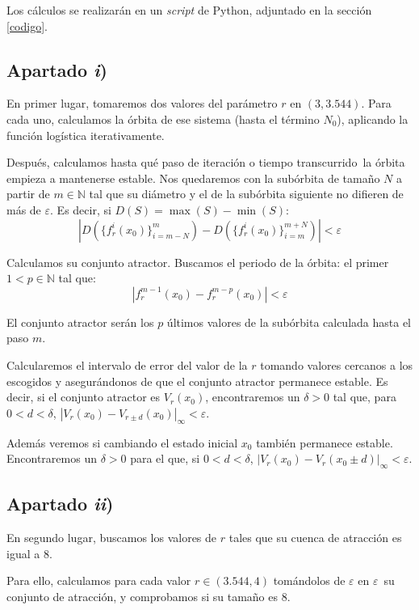 \documentclass[a4paper]{article}
\begin{document}
	Los cálculos se realizarán en un \textit{script} de Python, adjuntado en la sección \ref{codigo}.
	
	\subsection{Apartado \textit{i})}
	
	En primer lugar, tomaremos dos valores del parámetro $r$ en $(3,3.544)$. Para cada uno, calculamos la órbita de ese sistema (hasta el término $N_0$), aplicando la función logística iterativamente. 
	
	Después, calculamos hasta qué paso de iteración \textemdash o tiempo transcurrido\textemdash~la órbita empieza a mantenerse estable. Nos quedaremos con la subórbita de tamaño $N$ a partir de $m\in\mathbb{N}$ tal que su diámetro y el de la subórbita siguiente no difieren de más de $\varepsilon$. Es decir, si $D(S)=\max(S)-\min(S)$:
	\[ \left|D\left(\{f_r^i(x_0)\}_{i=m-N}^{m}\right) - D\left(\{f_r^i(x_0)\}_{i=m}^{m+N}\right)\right| < \varepsilon \]
	
	Calculamos su conjunto atractor. Buscamos el periodo de la órbita: el primer $1<p\in\mathbb{N}$ tal que:	
	\[ \left|f_r^{m-1}(x_0) - f_r^{m-p}(x_0)\right| < \varepsilon \]
	
	El conjunto atractor serán los $p$ últimos valores de la subórbita calculada hasta el paso $m$.
	
	Calcularemos el intervalo de error del valor de la $r$ tomando valores cercanos a los escogidos y asegurándonos de que el conjunto atractor permanece estable. Es decir, si el conjunto atractor es $V_r(x_0)$, encontraremos un $\delta>0$ tal que, para $0<d<\delta$,
	\( \left| V_r(x_0) - V_{r\pm d}(x_0) \right|_\infty < \varepsilon \).
	
	Además veremos si cambiando el estado inicial $x_0$ también permanece estable. Encontraremos un $\delta>0$ para el que, si $0<d<\delta$,
	\( \left| V_r(x_0) - V_r(x_0\pm d) \right|_\infty < \varepsilon \).
	
	\subsection{Apartado \textit{ii})}
		
	En segundo lugar, buscamos los valores de $r$ tales que su cuenca de atracción es igual a 8.
	
	Para ello, calculamos para cada valor $r\in(3.544,4)$ \textemdash tomándolos de $\varepsilon$ en $\varepsilon$\textemdash~su conjunto de atracción, y comprobamos si su tamaño es 8. 
	
\end{document}
